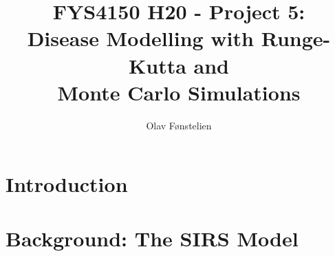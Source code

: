 \documentclass[]{article}
\title{FYS4150 H20 - Project 5:\\Disease Modelling with Runge-Kutta and\\Monte Carlo Simulations}
\author{Olav Fønstelien}
\begin{document}
\maketitle

\begin{abstract}

\end{abstract}

\section{Introduction} \label{sec:intro}


\section{Background: The SIRS Model} \label{sec:background-sirs}
\end{document}
